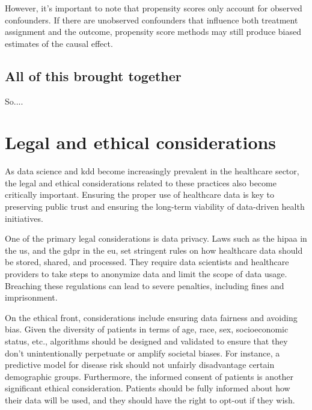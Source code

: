 However, it's important to note that propensity scores only account for observed confounders. If there are unobserved confounders that influence both treatment assignment and the outcome, propensity score methods may still produce biased estimates of the causal effect.






\subsection{All of this brought together}

So....



\section{Legal and ethical considerations}



As data science and \ac{kdd} become increasingly prevalent in the healthcare sector, the legal and ethical considerations related to these practices also become critically important. Ensuring the proper use of healthcare data is key to preserving public trust and ensuring the long-term viability of data-driven health initiatives.

One of the primary legal considerations is data privacy. Laws such as the \ac{hipaa} in the \ac{us}, and the \ac{gdpr} in the \ac{eu}, set stringent rules on how healthcare data should be stored, shared, and processed. They require data scientists and healthcare providers to take steps to anonymize data and limit the scope of data usage. Breaching these regulations can lead to severe penalties, including fines and imprisonment.

On the ethical front, considerations include ensuring data fairness and avoiding bias. Given the diversity of patients in terms of age, race, sex, socioeconomic status, etc., algorithms should be designed and validated to ensure that they don't unintentionally perpetuate or amplify societal biases. For instance, a predictive model for disease risk should not unfairly disadvantage certain demographic groups. Furthermore, the informed consent of patients is another significant ethical consideration. Patients should be fully informed about how their data will be used, and they should have the right to opt-out if they wish.

